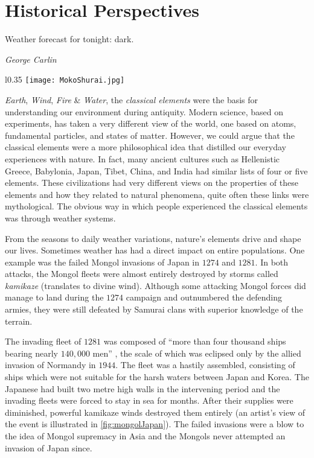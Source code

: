 \chapter{Historical Perspectives}\label{chapter:introduction}

\epigraph{Weather forecast for tonight: dark.}{\textit{George Carlin}}

\begin{wrapfigure}{l}{0.35\textwidth}
    \centering\texttt{[image: MokoShurai.jpg]}
    \caption{
        {\small
            The Mongol fleet destroyed in a typhoon, 1847. \textit{Source}: Kikuchi Y\={o}sai / 
            Tokyo National Museum (Public domain)
        } 
    }\label{fig:mongolJapan}
\end{wrapfigure}

\emph{Earth}, \emph{Wind}, \emph{Fire} \& \emph{Water}, the \emph{classical elements} were the 
basis for understanding our environment during antiquity. Modern science, based on experiments, has 
taken a very different view of the world, one based on atoms, fundamental particles, and states of 
matter. However, we could argue that the classical elements were a more philosophical idea that 
distilled our everyday experiences with nature. In fact, many ancient cultures such as 
Hellenistic Greece, Babylonia, Japan, Tibet, China, and India had similar lists of four or five 
elements. These civilizations had very different views on the properties of these elements and how 
they related to natural phenomena, quite often these links were mythological. The obvious way in 
which people experienced the classical elements was through weather systems. 

From the seasons to daily weather variations, nature's elements drive and shape our lives. 
Sometimes weather has had a direct impact on entire populations. One example was the failed Mongol 
invasions of Japan in $1274$ and $1281$. In both attacks, the Mongol fleets were almost entirely 
destroyed by storms called \emph{kamikaze} (translates to divine wind). Although some attacking 
Mongol forces did manage to land during the $1274$ campaign and outnumbered the defending armies, 
they were still defeated by Samurai clans with superior knowledge of the terrain. 

The invading fleet of $1281$ was composed of \enquote{more than four thousand ships bearing nearly 
$140,000$ men} \citep[pg.~17]{mcclain2002japan}, the scale of which was eclipsed only by the allied 
invasion of Normandy in $1944$. The fleet was a hastily assembled, consisting of ships which were 
not suitable for the harsh waters between Japan and Korea. The Japanese had built two metre high 
walls in the intervening period and the invading fleets were forced to stay in sea for months. 
After their supplies were diminished, powerful kamikaze winds destroyed them entirely (an artist's 
view of the event is illustrated in \cref{fig:mongolJapan}). The failed invasions were a blow to 
the idea of Mongol supremacy in Asia and the Mongols never attempted an invasion of Japan since.

